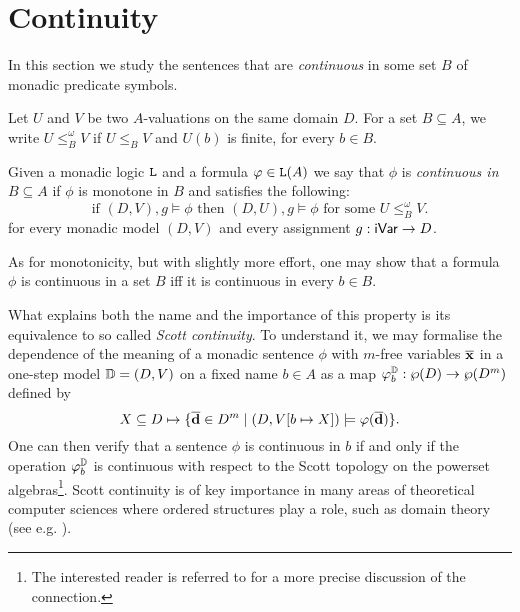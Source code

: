 
\section{Continuity}
\label{sec-cont}

In this section we study the sentences that are \emph{continuous} in some set 
$B$ of monadic predicate symbols.

\begin{definition}\label{def:cont}
Let $U$ and $V$ be two $A$-valuations on the same domain $D$.
For a set $B \subseteq A$, we write $U \leq^{\omega}_{B} V$ if $U \leq_{B} V$ 
and $U(b)$ is finite, for every $b \in B$.

Given a monadic logic $\mathtt{L}$ and a formula $\varphi \in \mathtt{L}(A)$ we say that
$\phi$ is \emph{continuous in $B \subseteq A$} if $\phi$ is monotone in $B$
and satisfies the following:
\begin{equation}
\label{eq:cont}
\text{if } (D, V), g \models \phi \text{ then } 
(D,  U), g \models \phi \text{ for some } U \leq^{\omega}_{B} V.
\end{equation}
for every monadic model $(D,V)$ and every assignment $g:\mathsf{iVar}\to D$.
\end{definition}

\begin{remark}\label{rem:contprodeach}
As for monotonicity, but with slightly more effort, one may show that a formula 
$\phi$ is continuous in a set $B$ iff it is continuous in every $b \in B$.
\end{remark}

What explains both the name and the importance of this property is its 
equivalence to so called \emph{Scott continuity}. 
To understand it, we may formalise the dependence of the meaning of a  monadic 
sentence $\phi$ with $m$-free variables $\overline{{\mathbf{x}}}$ in a one-step model $\mathbb{D}
= (D,V )$ on a fixed name $b \in A$ as a map $\varphi^{\mathbb{D}}_b : \wp(D) \to 
\wp(D^m)$ defined by 
\[
X \subseteq D \mapsto \{ \overline{{\mathbf{d}}} \in D^m \mid  
(D,V[b \mapsto X]) \models \varphi(\overline{{\mathbf{d}}}) \}.
\]
One can then verify that a sentence $\phi$ is continuous in $b$ if and only if 
the operation  $\varphi^{\mathbb{D}}_b$ is continuous with respect to the Scott 
topology on the powerset algebras\footnote{%
   The interested reader is referred to \cite[Sec. 8]{FV12} for a more precise 
   discussion of the connection.}. 
Scott continuity is of key importance in many areas of theoretical computer 
sciences where ordered structures play a role, such as domain theory (see 
e.g. \cite{abramsky1994domain}).

